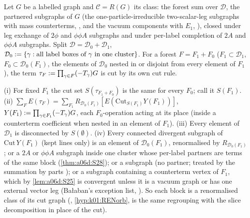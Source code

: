 Let $G$ be a labelled graph and $\mathcal C=R(G)$ its class: the forest sum over $\mathcal D$, the partnered subgraphs of $G$ (the one-particle-irreducible two-scalar-leg subgraphs with mass counterterms, \cite[p.~430]{Ba3}, and the vacuum components with $E_1$, \cite[p.~432]{Ba3}), closed under leg exchange of $2\phi$ and $\phi\phi A$ subgraphs and under per-label completion of $2A$ and $\phi\phi A$ subgraphs. Split $\mathcal D=\mathcal D_0+\mathcal D_1$, $\mathcal D_0:=\{\gamma:\text{all label boxes of }\gamma\text{ in one cluster}\}$. For a forest $F=F_1+F_0$ ($F_1\subset\mathcal D_1$, $F_0\subset\mathcal D_0(F_1)$, the elements of $\mathcal D_0$ nested in or disjoint from every element of $F_1$), the term $\tau_F:=\prod_{\gamma\in F}(-T_\gamma)G$ is cut by its own cut rule.

\begin{theorem}\label{thm:a06d:S23}
\textup{(i)} For fixed $F_1$ the cut set $S(\tau_{F_1+F_0})$ is the same for every $F_0$; call it $S(F_1)$. \textup{(ii)} $\sum_FE(\tau_F)=\sum_{F_1}R_{\mathcal D_0(F_1)}[E(\mathrm{Cut}_{S(F_1)}Y(F_1))]$, $Y(F_1):=\prod_{\gamma\in F_1}(-T_\gamma)G$, each $F_0$-operation acting at its place (inside a counterterm coefficient when nested in an element of $F_1$). \textup{(iii)} Every element of $\mathcal D_1$ is disconnected by $S(\emptyset)$. \textup{(iv)} Every connected divergent subgraph of $\mathrm{Cut}\,Y(F_1)$ (kept lines only) is an element of $\mathcal D_0(F_1)$, renormalised by $R_{\mathcal D_0(F_1)}$; or a $2A$ or $\phi\phi A$ subgraph inside one cluster whose per-label partners are terms of the same block (\cref{thm:a06d:S28}); or a \cite[(2.4)]{Ba3} subgraph (no partner; treated by the summation by parts \cite[(2.8)]{Ba3}); or a subgraph containing a counterterm vertex of $F_1$, which by \cref{lem:a06d:S25} is convergent unless it is a vacuum graph or has one external vector leg (Ba{\l}aban's exception list, \cite[p.~432]{Ba3}). So each block is a renormalised class of its cut graph (\RENorb, \cref{hyp:k01:RENorb}, is the same regrouping with the slice decomposition in place of the cut).
\end{theorem}

